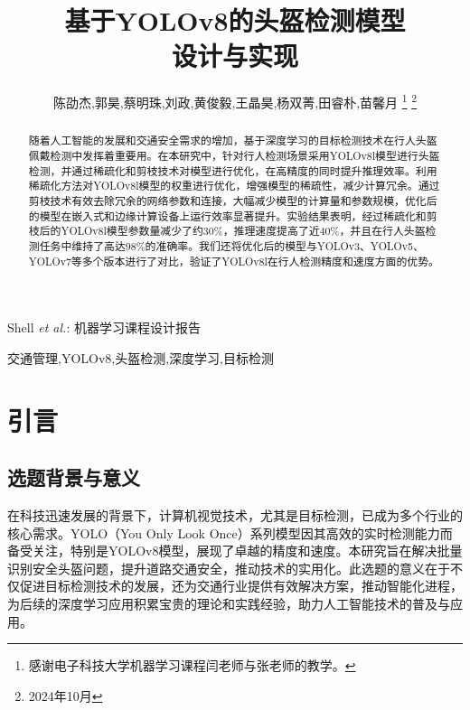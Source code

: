 \documentclass[journal]{IEEEtran}
\numberwithin{figure}{section}%
\begin{document}
\title{基于YOLOv8的头盔检测模型\\设计与实现}

\author{陈劭杰,郭昊,蔡明珠,刘政,黄俊毅,王晶昊,杨双菁,田睿朴,苗馨月%
\thanks{感谢电子科技大学机器学习课程闫老师与张老师的教学。}%
\thanks{2024年10月}}


%
{Shell \MakeLowercase{\textit{et al.}}: 机器学习课程设计报告}


\maketitle

\begin{abstract}
随着人工智能的发展和交通安全需求的增加，基于深度学习的目标检测技术在行人头盔佩戴检测中发挥着重要用。在本研究中，针对行人检测场景采用YOLOv8l模型进行头盔检测，并通过稀疏化和剪枝技术对模型进行优化，在高精度的同时提升推理效率。利用稀疏化方法对YOLOv8l模型的权重进行优化，增强模型的稀疏性，减少计算冗余。通过剪枝技术有效去除冗余的网络参数和连接，大幅减少模型的计算量和参数规模，优化后的模型在嵌入式和边缘计算设备上运行效率显著提升。实验结果表明，经过稀疏化和剪枝后的YOLOv8l模型参数量减少了约30\%，推理速度提高了近40\%，并且在行人头盔检测任务中维持了高达98\%的准确率。我们还将优化后的模型与YOLOv3、YOLOv5、YOLOv7等多个版本进行了对比，验证了YOLOv8l在行人检测精度和速度方面的优势。
\end{abstract}

\begin{IEEEkeywords}
交通管理,YOLOv8,头盔检测,深度学习,目标检测
\end{IEEEkeywords}

\IEEEpeerreviewmaketitle

\section{引言}

\subsection{选题背景与意义}
在科技迅速发展的背景下，计算机视觉技术，尤其是目标检测，已成为多个行业的核心需求。YOLO（You Only Look Once）系列模型因其高效的实时检测能力而备受关注，特别是YOLOv8模型，展现了卓越的精度和速度。本研究旨在解决批量识别安全头盔问题，提升道路交通安全，推动技术的实用化。此选题的意义在于不仅促进目标检测技术的发展，还为交通行业提供有效解决方案，推动智能化进程，为后续的深度学习应用积累宝贵的理论和实践经验，助力人工智能技术的普及与应用。
\end{document}
